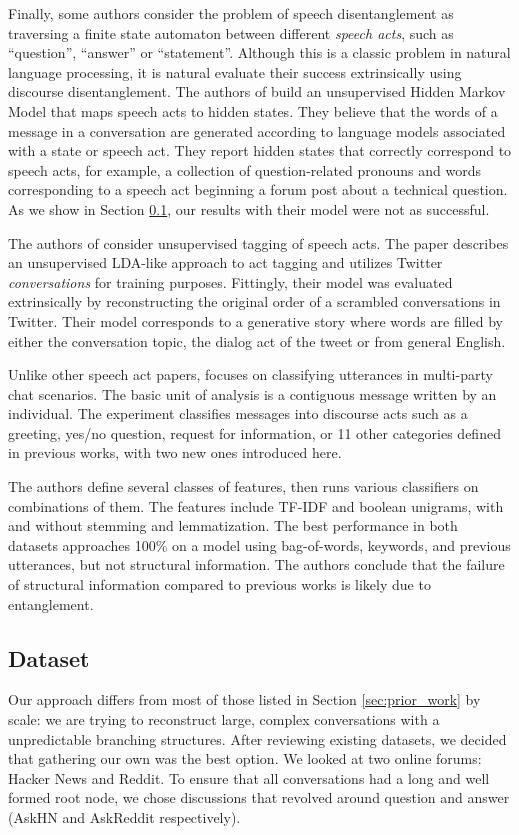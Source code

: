 \documentclass[10pt]{article}
\begin{document}
Finally, some authors consider the problem of speech disentanglement as traversing 
a finite state automaton between different \textit{speech acts}, such as
``question'', ``answer'' or ``statement''. Although this is a classic problem in
natural language processing, it is natural evaluate their success extrinsically 
using discourse disentanglement. The authors of \cite{Paula} build an 
unsupervised Hidden Markov Model that  maps speech acts to hidden states. 
They believe that the words of a message 
in a conversation are generated according to language models associated
with a state or speech act. They report hidden states
that correctly correspond to speech acts, for example, a collection of
question-related pronouns and words corresponding to a speech act beginning a
forum post about a technical question. As we show in Section \ref{sec:dataset}, 
our results with their model were not as successful.

The authors of \cite{Ritter2010a} consider unsupervised tagging of speech acts.
The paper describes an unsupervised LDA-like approach to act tagging 
and utilizes Twitter \textit{conversations} for
training purposes. Fittingly, their model was evaluated 
extrinsically by reconstructing the original order of a scrambled
conversations in Twitter. Their model corresponds to a generative story
where words are filled by either the conversation topic, the dialog
act of the tweet or from general English.

Unlike other speech act papers, \cite{Kim2012} 
focuses on classifying utterances
in multi-party chat scenarios. The basic unit
of analysis is a contiguous message written by an individual. The
experiment classifies messages into discourse acts such as a greeting, yes/no
question, request for information, or 11 other categories defined in previous
works, with two new ones introduced here.

The authors define several classes of features, then runs various classifiers on
combinations of them. The features include TF-IDF and boolean unigrams, with
and without stemming and lemmatization.  The best
performance in both datasets approaches 100\% on a model using bag-of-words,
keywords, and previous utterances, but not structural information. 
The authors conclude that the failure of structural information 
compared to previous works is likely due to entanglement.

\subsection{Dataset}
\label{sec:dataset}
Our approach differs from most of those listed in Section \ref{sec:prior_work}
by scale: we are trying to reconstruct large, complex
conversations with a unpredictable branching structures. After reviewing existing datasets,
we decided that gathering our own was the best option. We looked at two
online forums: Hacker News and Reddit. To ensure that all conversations had a long
and well formed root node, we chose discussions that revolved around question and answer 
(AskHN and AskReddit respectively). 
\end{document}
